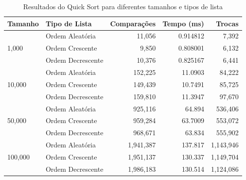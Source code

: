 \documentclass[tcc1,project]{uftex}
\begin{document}
\begin{table}[h]
\centering
\caption{Resultados do Quick Sort para diferentes tamanhos e tipos de lista}
\begin{tabular}{llrrr}
\toprule
\textbf{Tamanho} & \textbf{Tipo de Lista} & \textbf{Comparações} & \textbf{Tempo (ms)} & \textbf{Trocas} \\
\midrule
\multirow{3}{*}{1,000}   & Ordem Aleatória   & 11,056  & 0.914812  & 7,392 \\
                         & Ordem Crescente   & 9,850   & 0.808001  & 6,132 \\
                         & Ordem Decrescente & 10,376  & 0.825167  & 6,441 \\
\midrule
\multirow{3}{*}{10,000}  & Ordem Aleatória   & 152,225  & 11.0903   & 84,222 \\
                         & Ordem Crescente   & 149,439  & 10.7491   & 85,725 \\
                         & Ordem Decrescente & 159,810  & 11.3947   & 97,670 \\
\midrule
\multirow{3}{*}{50,000}  & Ordem Aleatória   & 925,116  & 64.894    & 536,406 \\
                         & Ordem Crescente   & 959,284  & 63.7009   & 553,072 \\
                         & Ordem Decrescente & 968,671  & 63.834    & 555,902 \\
\midrule
\multirow{3}{*}{100,000} & Ordem Aleatória   & 1,941,387  & 137.817  & 1,143,946 \\
                         & Ordem Crescente   & 1,951,137  & 130.337  & 1,149,704 \\
                         & Ordem Decrescente & 1,986,183  & 130.514  & 1,124,086 \\
\bottomrule
\end{tabular}
\end{table}
\end{document}
